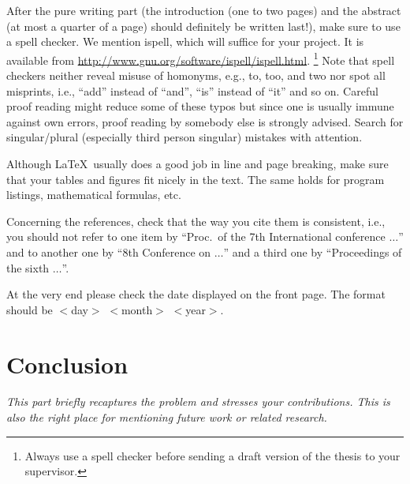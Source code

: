 \documentclass{howto}
\begin{document}
After the pure writing part (the introduction (one to two pages) and the
abstract (at most a quarter of a page) should definitely be written last!),
make sure to use a spell checker.
We mention \textsf{ispell}, which will suffice for
your project. It is available from
\url{http://www.gnu.org/software/ispell/ispell.html}.%
\footnote{Always use a spell checker before sending a draft
version of the thesis to your supervisor.}
Note that spell checkers neither reveal misuse of homonyms, e.g.,
to, too, and two nor spot all misprints, i.e., ``add''
instead of ``and'', ``is'' instead of ``it'' and so on. Careful proof
reading might reduce some of these typos but since one is usually immune
against own errors, proof reading by somebody else is strongly advised.
Search for singular/plural (especially third person singular) mistakes
with attention.

Although \LaTeX\ usually does a good job in line and page breaking, make
sure that your tables and figures fit nicely in the text. The same holds
for program listings, mathematical formulas, etc.

Concerning the references,
check that the way you cite them is consistent, i.e., you should not refer
to one item by ``Proc.\ of the 7th International conference $\ldots$'' and to
another one by ``8th Conference on $\ldots$'' and a third one by
``Proceedings of the sixth $\ldots$''.

At the very end please check the date displayed on the front page. The
format should be $<$day$>$ $<$month$>$ $<$year$>$.

\section{Conclusion}
\label{CON:main}
\emph{This part briefly recaptures the problem and stresses your
contributions. This is also the right place for mentioning future
work or related research.}
\end{document}
